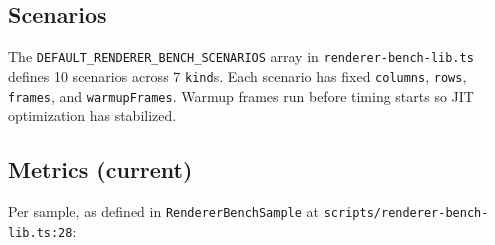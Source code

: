\subsection{Scenarios}\label{record-422-scenarios}

The \texttt{D\allowbreak{}E\allowbreak{}F\allowbreak{}A\allowbreak{}U\allowbreak{}L\allowbreak{}T\allowbreak{}\_\allowbreak{}R\allowbreak{}E\allowbreak{}N\allowbreak{}D\allowbreak{}E\allowbreak{}R\allowbreak{}E\allowbreak{}R\allowbreak{}\_\allowbreak{}B\allowbreak{}E\allowbreak{}N\allowbreak{}C\allowbreak{}H\allowbreak{}\_\allowbreak{}S\allowbreak{}C\allowbreak{}E\allowbreak{}N\allowbreak{}A\allowbreak{}R\allowbreak{}I\allowbreak{}O\allowbreak{}S} array in \texttt{r\allowbreak{}e\allowbreak{}n\allowbreak{}d\allowbreak{}e\allowbreak{}r\allowbreak{}e\allowbreak{}r\allowbreak{}-\allowbreak{}b\allowbreak{}e\allowbreak{}n\allowbreak{}c\allowbreak{}h\allowbreak{}-\allowbreak{}l\allowbreak{}i\allowbreak{}b\allowbreak{}.\allowbreak{}t\allowbreak{}s} defines 10 scenarios across 7 \texttt{k\allowbreak{}i\allowbreak{}n\allowbreak{}d}s. Each scenario has fixed \texttt{c\allowbreak{}o\allowbreak{}l\allowbreak{}u\allowbreak{}m\allowbreak{}n\allowbreak{}s}, \texttt{r\allowbreak{}o\allowbreak{}w\allowbreak{}s}, \texttt{f\allowbreak{}r\allowbreak{}a\allowbreak{}m\allowbreak{}e\allowbreak{}s}, and \texttt{w\allowbreak{}a\allowbreak{}r\allowbreak{}m\allowbreak{}u\allowbreak{}p\allowbreak{}F\allowbreak{}r\allowbreak{}a\allowbreak{}m\allowbreak{}e\allowbreak{}s}. Warmup frames run before timing starts so JIT optimization has stabilized.



\subsection{Metrics (current)}\label{record-422-metrics-current}

Per sample, as defined in \texttt{R\allowbreak{}e\allowbreak{}n\allowbreak{}d\allowbreak{}e\allowbreak{}r\allowbreak{}e\allowbreak{}r\allowbreak{}B\allowbreak{}e\allowbreak{}n\allowbreak{}c\allowbreak{}h\allowbreak{}S\allowbreak{}a\allowbreak{}m\allowbreak{}p\allowbreak{}l\allowbreak{}e} at \texttt{s\allowbreak{}c\allowbreak{}r\allowbreak{}i\allowbreak{}p\allowbreak{}t\allowbreak{}s\allowbreak{}/\allowbreak{}r\allowbreak{}e\allowbreak{}n\allowbreak{}d\allowbreak{}e\allowbreak{}r\allowbreak{}e\allowbreak{}r\allowbreak{}-\allowbreak{}b\allowbreak{}e\allowbreak{}n\allowbreak{}c\allowbreak{}h\allowbreak{}-\allowbreak{}l\allowbreak{}i\allowbreak{}b\allowbreak{}.\allowbreak{}t\allowbreak{}s\allowbreak{}:\allowbreak{}2\allowbreak{}8}:

